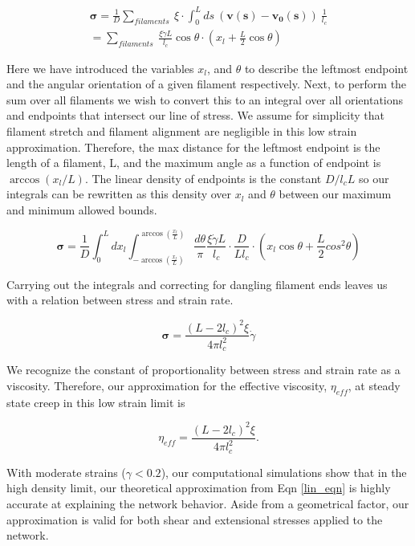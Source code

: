 \documentclass[pre,preprint]{revtex4-1}
\begin{document}
\begin{multline}
\mathbf{\sigma} =  \frac{1}{D}\sum_{filaments}\:  \xi \cdot \int_0^L ds \: (\mathbf{v(s)}-\mathbf{v_0(s)}) \:\frac{1}{l_c} \\
 = \sum_{filaments}\:  \frac{\xi \dot \gamma L}{l_c} \cos \theta \cdot (x_l + \frac{L}{2} \cos \theta)
\end{multline}

Here we have introduced the variables $x_l$, and $\theta$ to describe the leftmost endpoint and the angular orientation of a given filament respectively.  Next, to perform the sum over all filaments we wish to convert this to an integral over all orientations and endpoints that intersect our line of stress. We assume for simplicity that filament stretch and filament alignment are negligible in this low strain approximation.  Therefore, the max distance for the leftmost endpoint is the length of a filament, L, and the maximum angle as a function of endpoint is $\arccos(x_l/L)$.  The linear density of endpoints is the constant $D/l_cL$ so our integrals can be rewritten as this density over $x_l$ and $\theta$ between our maximum and minimum allowed bounds.

\begin{equation}
\mathbf{\sigma} =  \frac{1}{D} \int_0^L dx_l \int_{-\arccos (\frac{x_l}{L})}^{\arccos (\frac{x_l}{L})}\frac{d\theta}{\pi} \frac{\xi \dot \gamma L}{l_c} \cdot \frac{D}{Ll_c}\cdot (x_l \cos \theta + \frac{L}{2} cos^2\theta)
\end{equation}

Carrying out the integrals and correcting for dangling filament ends leaves us with a relation between stress and strain rate.

\begin{equation}
\mathbf{\sigma} = \frac{(L-2l_c)^2 \xi}{4\pi l_c^2} \dot \gamma 
\end{equation}

We recognize the constant of proportionality between stress and strain rate as a viscosity.  Therefore, our approximation for the effective viscosity, $\eta_{eff}$, at steady state creep in this low strain limit is

\begin{equation}
\label{lin_eqn}
\eta_{eff} = \frac{(L-2l_c)^2 \xi}{4\pi l_c^2} .
\end{equation}

With moderate strains ($\gamma<0.2$), our computational simulations show that in the high density limit, our theoretical approximation from Eqn \ref{lin_eqn} is highly accurate at explaining the network behavior.  Aside from a geometrical factor, our approximation is valid for both shear and extensional stresses applied to the network.
\end{document}
